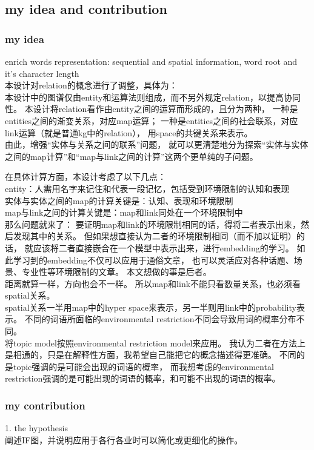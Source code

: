 \documentclass[12pt]{ctexart}
\theoremstyle{definition}
\begin{document}
\subsection{my idea and contribution}
\subsubsection{my idea}
enrich words representation: 
sequential and spatial information,
word root and it's character length\\
本设计对relation的概念进行了调整，具体为：\\
本设计中的图谱仅由entity和运算法则组成，而不另外规定relation，以提高协同性。
本设计将relation看作由entity之间的运算而形成的，且分为两种，
一种是entities之间的渐变关系，对应map运算；
一种是entities之间的社会联系，对应link运算（就是普通kg中的relation），
用space的共键关系来表示。\\
由此，增强“实体与关系之间的联系”问题，
就可以更清楚地分为探索“实体与实体之间的map计算”和“map与link之间的计算”这两个更单纯的子问题。

在具体计算方面，本设计考虑了以下几点：\\
entity：人需用名字来记住和代表一段记忆，包括受到环境限制的认知和表现\\
实体与实体之间的map的计算关键是：认知、表现和环境限制\\
map与link之间的计算关键是：map和link同处在一个环境限制中\\
那么问题就来了：
要证明map和link的环境限制相同的话，得将二者表示出来，然后发现其中的关系。
但如果想直接认为二者的环境限制相同（而不加以证明）的话，
就应该将二者直接嵌合在一个模型中表示出来，进行embedding的学习。
如此学习到的embedding不仅可以应用于通俗文章，
也可以灵活应对各种话题、场景、专业性等环境限制的文章。
本文想做的事是后者。\\

距离就算一样，方向也会不一样。
所以map和link不能只看数量关系，也必须看spatial关系。\\
spatial关系一半用map中的hyper space来表示，另一半则用link中的probability表示。
不同的词语所面临的environmental restriction不同会导致用词的概率分布不同。\\
将topic model按照environmental restriction model来应用。
我认为二者在方法上是相通的，只是在解释性方面，我希望自己能把它的概念描述得更准确。
不同的是topic强调的是可能会出现的词语的概率，
而我想考虑的environmental restriction强调的是可能出现的词语的概率，和可能不出现的词语的概率。\\

\subsubsection{my contribution}
1. the hypothesis\\
阐述IF图，并说明应用于各行各业时可以简化或更细化的操作。
\end{document}
